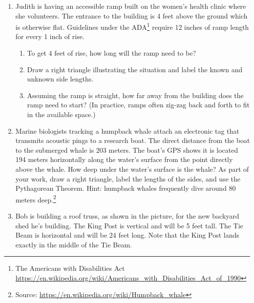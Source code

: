 \begin{enumerate}
\item Judith is having an accessible ramp built on the women's health clinic where she volunteers.  The entrance to the building is 4 feet above the ground which is otherwise flat.  Guidelines under the ADA\footnote{The Americans with Disabilities Act \url{https://en.wikipedia.org/wiki/Americans_with_Disabilities_Act_of_1990}} require 12 inches of ramp length for every 1 inch of rise.
\begin{enumerate}
    \item To get 4 feet of rise, how long will the ramp need to be?
    \item Draw a right triangle illustrating the situation and label the known and unknown side lengths.
    \item Assuming the ramp is straight, how far away from the building does the ramp need to start?  (In practice, ramps often zig-zag back and forth to fit in the available space.)
\end{enumerate}

\item Marine biologists tracking a humpback whale attach an electronic tag that transmits acoustic pings to a research boat. The direct distance from the boat to the submerged whale is 203 meters. The boat's GPS shows it is located 194 meters horizontally along the water's surface from the point directly above the whale.  How deep under the water's surface is the whale?  As part of your work, draw a right triangle, label the lengths of the sides, and use the Pythagorean Theorem.  Hint:  humpback whales frequently dive around 80 meters deep.\footnote{Source: \url{https://en.wikipedia.org/wiki/Humpback_whale}}

\item Bob is building a roof truss, as shown in the picture, for the new backyard shed he's building.  The King Post is vertical and will be 5 feet tall.  The Tie Beam is horizontal and will be 24 feet long.  Note that the King Post lands exactly in the middle of the Tie Beam.


\begin{center}
\end{center}
\end{enumerate}
